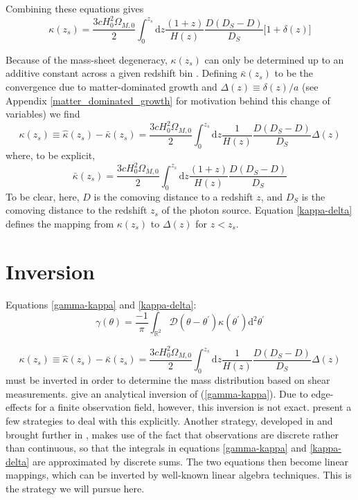 \documentclass[12pt,preprint]{aastex}			%
\newcommand{\dd}{\mathrm{d}} %
\begin{document}
Combining these equations gives
\begin{equation}
  \kappa(z_s) = \frac{3cH_0^2\Omega_{M,0}}{2}\int_0^{z_s} \dd z \frac{(1+z)}{H(z)} \frac{D(D_S-D)}{D_S}\big[1+\delta(z)\big]
\end{equation}

Because of the mass-sheet degeneracy, $\kappa(z_s)$ can only be determined up to an additive constant across a given redshift bin \citep[see][for discussion]{Seitz_Schneider96}.  Defining $\bar{\kappa}(z_s)$ to be the convergence due to matter-dominated growth and $\Delta(z) \equiv \delta(z)/a$ (see Appendix \ref{matter_dominated_growth} for motivation behind this change of variables) we find
\begin{equation}
  \label{kappa-delta}
  \kappa(z_s) \equiv \hat{\kappa}(z_s)-\bar\kappa(z_s) = 
  \frac{3cH_0^2\Omega_{M,0}}{2}\int_0^{z_s} \dd z 
  \frac{1}{H(z)} \frac{D(D_S-D)}{D_S}\Delta(z)
\end{equation}
where, to be explicit,
\begin{equation}
  \bar\kappa(z_s) = \frac{3cH_0^2\Omega_{M,0}}{2}\int_0^{z_s} \dd z 
  \frac{(1+z)}{H(z)} \frac{D(D_S-D)}{D_S}
\end{equation}
To be clear, here, $D$ is the comoving distance to a redshift $z$, and $D_S$ is the comoving distance to the redshift $z_s$ of the photon source.  Equation \ref{kappa-delta} defines the mapping from $\kappa(z_s)$ to $\Delta(z)$ for $z<z_s$.  

\section{Inversion}
Equations \ref{gamma-kappa} and \ref{kappa-delta}:
\begin{equation}
  \gamma(\theta) 
  = \frac{-1}{\pi}\int_{\mathbb{R}^2} \mathcal{D}(\theta - 
  \theta^\prime)\kappa(\theta^\prime) \dd^2\theta^\prime
\end{equation}

\begin{equation}
  \kappa(z_s) \equiv \hat{\kappa}(z_s)-\bar\kappa(z_s) = 
  \frac{3cH_0^2\Omega_{M,0}}{2}\int_0^{z_s} \dd z 
  \frac{1}{H(z)} \frac{D(D_S-D)}{D_S}\Delta(z)
\end{equation}
must be inverted in order to determine the mass distribution based on shear measurements.  \citet{Kaiser_Squires93} give an analytical inversion of (\ref{gamma-kappa}).  Due to edge-effects for a finite observation field, however, this inversion is not exact.  \citet{Seitz_Schneider96} present a few strategies to deal with this explicitly.  Another strategy, developed in \citet{Hu02} and brought further in \citet{Simon09}, makes use of the fact that observations are discrete rather than continuous, so that the integrals in equations \ref{gamma-kappa} and \ref{kappa-delta} are approximated by discrete sums.  The two equations then become linear mappings, which can be inverted by well-known linear algebra techniques.  This is the strategy we will pursue here.
\end{document}
